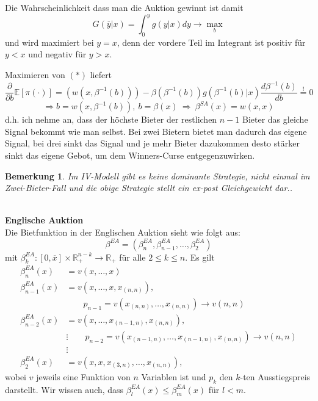 \documentclass[12pt]{extreport} %
\newcommand{\R}{\mathbb{R}}
\theoremstyle{named}
\theoremstyle{nnamed}
\theoremstyle{itshape}
\theoremstyle{normal}
\newtheorem*{bemerkung}{Bemerkung}
\begin{document}
Die Wahrscheinlichkeit dass man die Auktion gewinnt ist damit
$$ G \left(\overline{y} | x \right) = \int_{0}^{y} g \left(y | x \right) dy \longrightarrow \max_{b} $$
und wird maximiert bei $y = x$, denn der vordere Teil im Integrant ist positiv für $y < x$ und negativ für $y > x$.

Maximieren von $(*)$ liefert
$$ \frac{\partial}{\partial b} \mathds{E} \left[ \pi(\cdot) \right] = \left( w(x, \beta^{-1}(b)) \right) - \beta \left( \beta^{-1}(b) \right) g\left( \beta^{-1}(b) | x \right)  \frac{d\beta^{-1}(b)}{db} \overset{!}{=} 0 $$
$$ \Rightarrow b = w\left( x, \beta^{-1}(b) \right), ~b = \beta(x) ~\Rightarrow~ \beta^{SA}(x) = w(x,x) $$
d.h. ich nehme an, dass der höchste Bieter der restlichen $n-1$ Bieter das gleiche Signal bekommt wie man selbst. Bei zwei Bietern bietet man dadurch das eigene Signal, bei drei sinkt das Signal und je mehr Bieter dazukommen desto stärker sinkt das eigene Gebot, um dem Winners-Curse entgegenzuwirken.

\begin{bemerkung}
	Im IV-Modell gibt es keine dominante Strategie, nicht einmal im Zwei-Bieter-Fall und die obige Strategie stellt ein ex-post Gleichgewicht dar..	
\end{bemerkung} ~\\
\textbf{Englische Auktion} ~\\
Die Bietfunktion in der Englischen Auktion sieht wie folgt aus:
	$$ \beta^{EA} = \left( \beta^{EA}_{n}, \beta^{EA}_{n-1}, \dotsc, \beta^{EA}_{2} \right) $$
mit $\beta^{EA}_{k} \colon [0, \overline{x}] \times \R^{n-k}_{+} \rightarrow \R_{+}$ für alle $2 \leq k \leq n$. Es gilt
\begin{align*}
	\beta^{EA}_{n}(x) & = v(x, \dotsc, x) \\
	\beta^{EA}_{n-1}(x) & = v(x, \dotsc, x, x_{(n,n)}), \\ 
	& \qquad p_{n-1} = v(x_{(n,n)}, \dotsc, x_{(n,n)}) \rightarrow v(n,n) \\
	\beta^{EA}_{n-2}(x) & = v(x, \dotsc, x_{(n-1,n)}, x_{(n,n)}), \\
	& \vdots \qquad p_{n-2} = v(x_{(n-1,n)}, \dotsc, x_{(n-1,n)}, x_{(n,n)}) \rightarrow v(n,n) \\	
	& \vdots \\
		\beta^{EA}_{2}(x) & = v(x, x, x_{(3, n)}, \dotsc, x_{(n,n)}),
\end{align*}
wobei $v$ jeweils eine Funktion von $n$ Variablen ist und $p_{k}$ den $k$-ten Ausstiegspreis darstellt. Wir wissen auch, dass $\beta_{l}^{EA}(x) \leq \beta_{m}^{EA}(x)$ für $l < m$. ~\\
\end{document}
